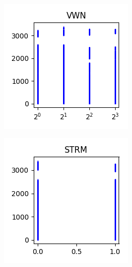 \documentclass[sigconf,authorversion]{acmart}
\begin{document}
\begin{figure}[hbtp]\ContinuedFloat
    \centering
    \begin{subfigure}[b]{0.3\textwidth}
        \includegraphics[width=\textwidth]{img/VWN.png}
        \label{fig:vwn}
    \end{subfigure}
    \begin{subfigure}[b]{0.3\textwidth}
        \includegraphics[width=\textwidth]{img/STRM.png}

\end{subfigure}
\end{figure}
\end{document}

